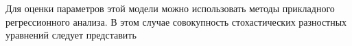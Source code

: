 Для оценки параметров этой модели можно использовать методы прикладного регрессионного анализа. В этом случае совокупность стохастических разностных уравнений следует представить 
